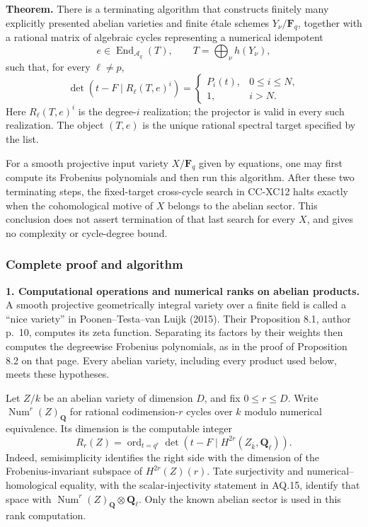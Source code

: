 \textbf{Theorem.} There is a terminating algorithm that constructs
finitely many explicitly presented abelian varieties and finite étale
schemes \(Y_\nu/\mathbf F_q\), together with a rational matrix of
algebraic cycles representing a numerical idempotent \[
 e\in\operatorname{End}_{\mathcal A_q}(T),\qquad
 T=\bigoplus_\nu h(Y_\nu),                               \tag{CC-XC.E2}
\] such that, for every \(\ell\ne p\), \[
 \det(t-F\mid R_\ell(T,e)^i)=
 \begin{cases}
 P_i(t),&0\le i\le N,\\
 1,&i>N.
 \end{cases}                                           \tag{CC-XC.E3}
\] Here \(R_\ell(T,e)^i\) is the degree-\(i\) realization; the projector
is valid in every such realization. The object \((T,e)\) is the unique
rational spectral target specified by the list.

For a smooth projective input variety \(X/\mathbf F_q\) given by
equations, one may first compute its Frobenius polynomials and then run
this algorithm. After these two terminating steps, the fixed-target
cross-cycle search in CC-XC12 halts exactly when the cohomological
motive of \(X\) belongs to the abelian sector. This conclusion does not
assert termination of that last search for every \(X\), and gives no
complexity or cycle-degree bound.

\subsubsection{Complete proof and
algorithm}\label{complete-proof-and-algorithm}

\textbf{1. Computational operations and numerical ranks on abelian
products.} A smooth projective geometrically integral variety over a
finite field is called a ``nice variety'' in Poonen--Testa--van Luijk
(2015). Their Proposition 8.1, author p.~10, computes its zeta function.
Separating its factors by their weights then computes the degreewise
Frobenius polynomials, as in the proof of Proposition 8.2 on that page.
Every abelian variety, including every product used below, meets these
hypotheses.

Let \(Z/k\) be an abelian variety of dimension \(D\), and fix
\(0\le r\le D\). Write \(\operatorname{Num}^r(Z)_{\mathbf Q}\) for
rational codimension-\(r\) cycles over \(k\) modulo numerical
equivalence. Its dimension is the computable integer \[
 R_r(Z)=
 \operatorname{ord}_{t=q^r}
       \det(t-F\mid H^{2r}(Z_{\bar k},\mathbf Q_\ell)).
                                                        \tag{CC-XC.E4}
\] Indeed, semisimplicity identifies the right side with the dimension
of the Frobenius-invariant subspace of \(H^{2r}(Z)(r)\). Tate
surjectivity and numerical--homological equality, with the
scalar-injectivity statement in AQ.15, identify that space with
\(\operatorname{Num}^r(Z)_{\mathbf Q}\otimes\mathbf Q_\ell\). Only the
known abelian sector is used in this rank computation.

